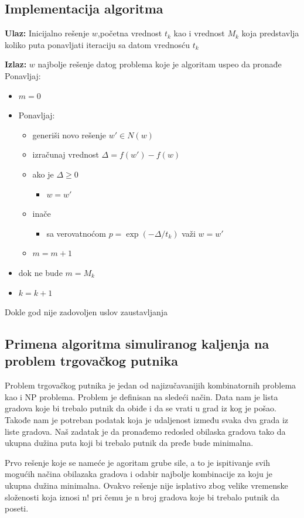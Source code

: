 \documentclass[a4paper]{article}
\begin{document}
\subsection{Implementacija algoritma}
\textbf{Ulaz:} \hspace{0.1cm} Inicijalno rešenje $w$,početna vrednost $t_k$ kao i vrednost $M_k$ koja predstavlja koliko puta ponavljati iteraciju sa datom vrednosću $t_k$
 \par
\textbf{Izlaz:}\hspace{0.1cm} $w$ najbolje rešenje datog problema koje je algoritam uspeo da pronađe
\newline
Ponavljaj:
\begin{itemize}
\item[] $m=0$
\item[]  Ponavljaj:
\begin{itemize}
\item[] generiši novo rešenje  $w'\in N(w)$
\item[] izračunaj vrednost  $\Delta=f(w')-f(w)$
\item[] ako je $\Delta \geq 0$
\begin{itemize}
\item[] $w=w'$ 
\end{itemize}
\item[]inače
\begin{itemize}
\item[] sa verovatnoćom $p=\exp(-\Delta/t_k)$ važi $w=w'$ 
\end{itemize}
\item[]$m=m+1$
\end{itemize}
\item[]dok ne bude $ m=M_k$
\item[] $k=k+1$
\end{itemize}
Dokle god nije zadovoljen uslov zaustavljanja


\subsection{Primena algoritma simuliranog kaljenja \cite{sannealing_tsp_application} na problem trgovačkog putnika}


  Problem trgovačkog putnika je jedan od najizučavanijih kombinatornih problema kao i NP problema. Problem je definisan na sledeći način.
  Data nam je lista gradova koje bi trebalo putnik da obiđe i da se vrati u grad iz kog je pošao. Takođe nam je potreban podatak koja je udaljenost između svaka dva grada iz liste gradova. Naš zadatak je da pronađemo redosled obilaska gradova tako da ukupna dužina puta koji bi trebalo putnik da pređe bude minimalna.\par
  Prvo rešenje koje se nameće je agoritam grube sile, a to je ispitivanje svih mogućih načina obilazaka gradova i odabir najbolje kombinacije za koju je ukupna dužina minimalna. Ovakvo rešenje nije isplativo zbog velike vremenske složenosti koja iznosi n! pri čemu je n broj gradova koje bi trebalo putnik da poseti.\par
    
\end{document}
